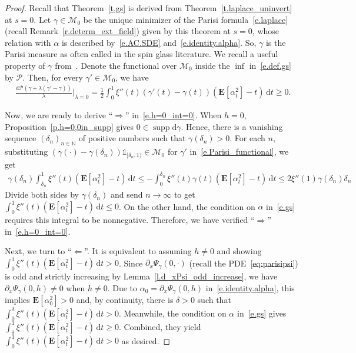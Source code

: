 \documentclass[11pt]{amsart}
\theoremstyle{remark}
\theoremstyle{definition}
\numberwithin{equation}{section}
\numberwithin{proposition}{section}
\numberwithin{figure}{section}
\numberwithin{table}{section}
\newcommand{\N}{\mathbb{N}}
\newcommand{\EE}{\mathbf{E}}
\renewcommand{\leq}{\leqslant}
\renewcommand{\geq}{\geqslant}
\newcommand{\Ll}{\left}
\newcommand{\Rr}{\right}
\renewcommand{\d}{\mathrm{d}}
\newcommand{\1}{\mathbf{1}}
\newcommand{\mcl}{\mathcal}
\newcommand{\al}{\alpha}
\DeclareMathOperator{\supp}{supp}
\newcommand{\cM}{\mathcal{M}}
\begin{document}
\begin{proof}
Recall that Theorem~\ref{t.gs} is derived from Theorem~\ref{t.laplace_uninvert} at $s=0$. Let $\gamma\in\cM_0$ be the unique minimizer of the Parisi formula~\eqref{e.laplace} (recall Remark~\ref{r.determ_ext_field}) given by this theorem at $s=0$, whose relation with $\alpha$ is described by~\eqref{e.AC.SDE} and~\eqref{e.identity.alpha}. So, $\gamma$ is the Parisi measure as often called in the spin glass literature. We recall a useful property of $\gamma$ from~\cite[Proposition~4]{chen2017fluctuations}. Denote the functional over $\cM_0$ inside the $\inf$ in~\eqref{e.def.gs} by $\mcl P$. Then, for every $\gamma'\in\cM_0$, we have
\begin{align}\label{e.Parisi_functional}
    \frac{\d\mcl P(\gamma+\lambda(\gamma'-\gamma))}{\lambda}\Big|_{\lambda=0}= \frac{1}{2}\int_0^1\xi''(t)(\gamma'(t)-\gamma(t))(\EE[\al_t^2] - t) \, \d t \geq 0.
\end{align}

Now, we are ready to derive ``$\Longrightarrow$'' in~\eqref{e.h=0_int=0}. When $h=0$, Proposition~\ref{p.h=0,0in_supp} gives $0\in\supp\d\gamma$. Hence, there is a vanishing sequence $(\delta_n)_{n\in\N}$ of positive numbers such that $\gamma(\delta_n)>0$. For each $n$, substituting $(\gamma(\cdot)-\gamma(\delta_n))\mathds{1}_{[\delta_n,1)}\in\cM_0$ for $\gamma'$ in~\eqref{e.Parisi_functional}, we get
\begin{align*}
    \gamma(\delta_n)\int_{\delta_n}^1\xi''(t)(\EE[\al_t^2] - t) \, \d t \leq -\int_0^{\delta_n}\xi''(t)\gamma(t)(\EE[\al_t^2] - t) \, \d t \leq 2\xi''(1)\gamma(\delta_n)\delta_n
\end{align*}
Divide both sides by $\gamma(\delta_n)$ and send $n\to\infty$ to get $\int_0^1\xi''(t)(\EE[\al_t^2] - t) \, \d t \leq 0$. On the other hand, the condition on $\alpha$ in~\eqref{e.gs} requires this integral to be nonnegative. Therefore, we have verified ``$\Longrightarrow$'' in~\eqref{e.h=0_int=0}.

Next, we turn to ``$\Longleftarrow$''. It is equivalent to assuming $h\neq 0$ and showing $\int_0^1\xi''(t)(\EE[\al_t^2] - t) \, \d t>0$. Since $\partial_x\Psi_\gamma(0,\cdot)$ (recall the PDE~\eqref{eq:parisipsi}) is odd and strictly increasing by Lemma~\ref{l.d_xPsi_odd_increase}, we have $\partial_x\Psi_\gamma(0,h)\neq 0$ when $h\neq 0$. Due to $\alpha_0=\partial_x\Psi_\gamma(0,h)$ in~\eqref{e.identity.alpha}, this implies $\EE[\alpha_0^2]>0$ and, by continuity, there is $\delta>0$ such that $\int_0^\delta\xi''(t)\Ll(\EE[\alpha_t^2]-t\Rr)\,\d t >0$. Meanwhile, the condition on $\alpha$ in~\eqref{e.gs} gives $\int_{\delta}^1\xi''(t)\Ll(\EE[\alpha_t^2]-t\Rr)\,\d t \geq0$. Combined, they yield $\int_0^1\xi''(t)\Ll(\EE[\alpha_t^2]-t\Rr)\,\d t > 0$ as desired.
\end{proof}
\end{document}
